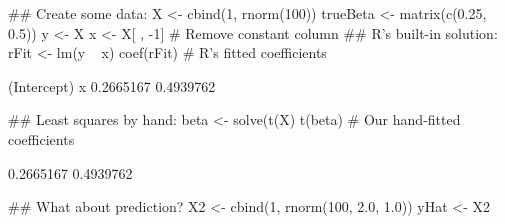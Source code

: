 \begin{Schunk}
\begin{Sinput}
 ## Create some data:
 X <- cbind(1, rnorm(100))
 trueBeta <- matrix(c(0.25, 0.5))
 y <- X %*% trueBeta + rnorm(100, 0.0, 0.1)
 x <- X[ , -1] # Remove constant column
 ## R's built-in solution:
 rFit <- lm(y ~ x)
 coef(rFit) # R's fitted coefficients
\end{Sinput}
\begin{Soutput}
(Intercept)           x 
  0.2665167   0.4939762 
\end{Soutput}
\begin{Sinput}
 ## Least squares by hand:
 beta <- solve(t(X) %*% X) %*% t(X) %*% y
 t(beta) # Our hand-fitted coefficients
\end{Sinput}
\begin{Soutput}
          [,1]      [,2]
[1,] 0.2665167 0.4939762
\end{Soutput}
\begin{Sinput}
 ## What about prediction?
 X2 <- cbind(1, rnorm(100, 2.0, 1.0))
 yHat <- X2 %*% beta
\end{Sinput}
\end{Schunk}
